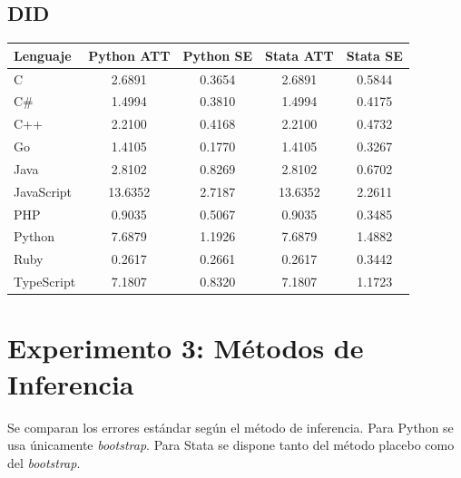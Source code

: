 \documentclass[12pt,a4paper]{article}
\begin{document}
\subsection*{DID}
\begin{tabular}{lcccc}
\toprule
Lenguaje & \textcolor{pyblue}{Python ATT} & \textcolor{pyblue}{Python SE} & \textcolor{statagreen}{Stata ATT} & \textcolor{statagreen}{Stata SE} \\
\midrule
  C & 2.6891 & 0.3654 & 2.6891 & 0.5844 \\
  C\# & 1.4994 & 0.3810 & 1.4994 & 0.4175 \\
  C++ & 2.2100 & 0.4168 & 2.2100 & 0.4732 \\
  Go & 1.4105 & 0.1770 & 1.4105 & 0.3267 \\
  Java & 2.8102 & 0.8269 & 2.8102 & 0.6702 \\
  JavaScript & 13.6352 & 2.7187 & 13.6352 & 2.2611 \\
  PHP & 0.9035 & 0.5067 & 0.9035 & 0.3485 \\
  Python & 7.6879 & 1.1926 & 7.6879 & 1.4882 \\
  Ruby & 0.2617 & 0.2661 & 0.2617 & 0.3442 \\
  TypeScript & 7.1807 & 0.8320 & 7.1807 & 1.1723 \\
\bottomrule
\end{tabular}

\section{Experimento 3: M\'etodos de Inferencia}

Se comparan los errores est\'andar seg\'un el m\'etodo de inferencia.
Para Python se usa \'unicamente \textit{bootstrap}.
Para Stata se dispone tanto del m\'etodo placebo como del \textit{bootstrap}.
\end{document}
